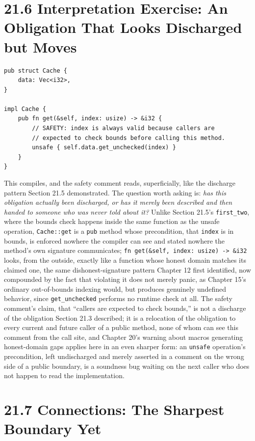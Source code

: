 \documentclass[11pt]{book}
\begin{document}
\section*{21.6 Interpretation Exercise: An Obligation That Looks Discharged but Moves}

\begin{lstlisting}
pub struct Cache {
    data: Vec<i32>,
}

impl Cache {
    pub fn get(&self, index: usize) -> &i32 {
        // SAFETY: index is always valid because callers are
        // expected to check bounds before calling this method.
        unsafe { self.data.get_unchecked(index) }
    }
}
\end{lstlisting}

This compiles, and the safety comment reads, superficially, like the discharge pattern Section 21.5 demonstrated. The question worth asking is: \emph{has this obligation actually been discharged, or has it merely been described and then handed to someone who was never told about it?} Unlike Section 21.5's \texttt{first\_two}, where the bounds check happens inside the same function as the unsafe operation, \texttt{Cache::get} is a \texttt{pub} method whose precondition, that \texttt{index} is in bounds, is enforced nowhere the compiler can see and stated nowhere the method's own signature communicates; \texttt{fn get(\&self, index: usize) -> \&i32} looks, from the outside, exactly like a function whose honest domain matches its claimed one, the same dishonest-signature pattern Chapter 12 first identified, now compounded by the fact that violating it does not merely panic, as Chapter 15's ordinary out-of-bounds indexing would, but produces genuinely undefined behavior, since \texttt{get\_unchecked} performs no runtime check at all. The safety comment's claim, that ``callers are expected to check bounds,'' is not a discharge of the obligation Section 21.3 described; it is a relocation of the obligation to every current and future caller of a public method, none of whom can see this comment from the call site, and Chapter 20's warning about macros generating honest-domain gaps applies here in an even sharper form: an \texttt{unsafe} operation's precondition, left undischarged and merely asserted in a comment on the wrong side of a public boundary, is a soundness bug waiting on the next caller who does not happen to read the implementation.

\section*{21.7 Connections: The Sharpest Boundary Yet}
\end{document}
